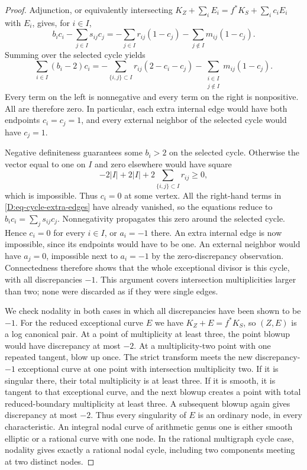 \begin{proof}
Adjunction, or equivalently intersecting
$K_Z+\sum_iE_i=f^*K_S+\sum_i c_i E_i$
with $E_i$, gives, for $i\in I$,
\begin{equation}\label{D:eq-cycle-extra-edges}
 b_i c_i-\sum_{j\in I}s_{ij}c_j
 =-\sum_{j\in I}r_{ij}(1-c_j)
  -\sum_{j\notin I}m_{ij}(1-c_j).
\end{equation}
Summing over the selected cycle yields
\begin{equation}\label{D:eq-cycle-sum}
 \sum_{i\in I}(b_i-2)c_i
 =-\sum_{\{i,j\}\subset I}r_{ij}(2-c_i-c_j)
  -\sum_{\substack{i\in I\\j\notin I}}m_{ij}(1-c_j).
\end{equation}
Every term on the left is nonnegative and every term
on the right is nonpositive.  All are therefore zero.
In particular, each extra internal edge would have
both endpoints $c_i=c_j=1$, and every external
neighbor of the selected cycle would have $c_j=1$.

Negative definiteness guarantees some $b_i>2$ on the
selected cycle.  Otherwise the vector equal to one
on $I$ and zero elsewhere would have square
\[
 -2|I|+2|I|+2\sum_{\{i,j\}\subset I}r_{ij}\geq0,
\]
which is impossible.  Thus $c_i=0$ at some vertex.
All the right-hand terms in
\eqref{D:eq-cycle-extra-edges} have already vanished,
so the equations reduce to
$b_i c_i=\sum_j s_{ij}c_j$.
Nonnegativity propagates this zero around the selected
cycle.  Hence $c_i=0$ for every $i\in I$, or
$a_i=-1$ there.
An extra internal edge is now impossible, since its
endpoints would have to be one.  An external neighbor
would have $a_j=0$, impossible next to $a_i=-1$ by
the zero-discrepancy observation.  Connectedness
therefore shows that the whole exceptional divisor
is this cycle, with all discrepancies $-1$.
This argument covers intersection multiplicities
larger than two; none were discarded as if they
were single edges.

We check nodality in both cases in which all
discrepancies have been shown to be $-1$.
For the reduced exceptional curve $E$ we have
$K_Z+E=f^*K_S$, so $(Z,E)$ is a log canonical pair.
At a point of multiplicity at least three, the
point blowup would have discrepancy at most $-2$.
At a multiplicity-two point with one repeated
tangent, blow up once.  The strict transform
meets the new discrepancy-$-1$ exceptional curve
at one point with intersection multiplicity two.
If it is singular there, their total multiplicity
is at least three.  If it is smooth, it is tangent
to that exceptional curve, and the next blowup
creates a point with total reduced-boundary
multiplicity at least three.  A subsequent blowup
again gives discrepancy at most $-2$.
Thus every singularity of $E$ is an ordinary node,
in every characteristic.
An integral nodal curve of arithmetic genus one
is either smooth elliptic or a rational curve
with one node.  In the rational multigraph cycle
case, nodality gives exactly a rational nodal
cycle, including two components meeting at two
distinct nodes.


\end{proof}
